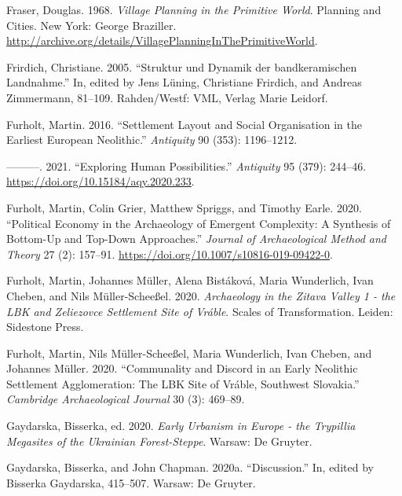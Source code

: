 \documentclass[
  12pt,
  a4paper, twoside]{book}
\newlength{\cslhangindent}
\newlength{\cslentryspacingunit} %
\newenvironment{CSLReferences}[2] %
 {%
  \setlength{\parindent}{0pt}
  \ifodd #1
  \let\oldpar\par
  \def\par{\hangindent=\cslhangindent\oldpar}
  \fi
  \setlength{\parskip}{#2\cslentryspacingunit}
 }%
 {}
\begin{document}
\begin{CSLReferences}{1}{0}
\leavevmode{}%
Fraser, Douglas. 1968. \emph{Village Planning in the Primitive World}. Planning and Cities. New York: George Braziller. \url{http://archive.org/details/VillagePlanningInThePrimitiveWorld}.

\leavevmode{}%
Frirdich, Christiane. 2005. {``Struktur und Dynamik der bandkeramischen Landnahme.''} In, edited by Jens Lüning, Christiane Frirdich, and Andreas Zimmermann, 81--109. Rahden/Westf: VML, Verlag Marie Leidorf.

\leavevmode{}%
Furholt, Martin. 2016. {``Settlement Layout and Social Organisation in the Earliest European Neolithic.''} \emph{Antiquity} 90 (353): 1196--1212.

\leavevmode{}%
---------. 2021. {``Exploring Human Possibilities.''} \emph{Antiquity} 95 (379): 244--46. \url{https://doi.org/10.15184/aqy.2020.233}.

\leavevmode{}%
Furholt, Martin, Colin Grier, Matthew Spriggs, and Timothy Earle. 2020. {``Political Economy in the Archaeology of Emergent Complexity: A Synthesis of Bottom-Up and Top-Down Approaches.''} \emph{Journal of Archaeological Method and Theory} 27 (2): 157--91. \url{https://doi.org/10.1007/s10816-019-09422-0}.

\leavevmode{}%
Furholt, Martin, Johannes Müller, Alena Bistáková, Maria Wunderlich, Ivan Cheben, and Nils Müller-Scheeßel. 2020. \emph{Archaeology in the Zitava Valley 1 - the LBK and Zeliezovce Settlement Site of Vráble}. Scales of Transformation. Leiden: Sidestone Press.

\leavevmode{}%
Furholt, Martin, Nils Müller-Scheeßel, Maria Wunderlich, Ivan Cheben, and Johannes Müller. 2020. {``Communality and Discord in an Early Neolithic Settlement Agglomeration: The LBK Site of Vráble, Southwest Slovakia.''} \emph{Cambridge Archaeological Journal} 30 (3): 469--89.

\leavevmode{}%
Gaydarska, Bisserka, ed. 2020. \emph{Early Urbanism in Europe - the Trypillia Megasites of the Ukrainian Forest-Steppe}. Warsaw: De Gruyter.

\leavevmode{}%
Gaydarska, Bisserka, and John Chapman. 2020a. {``Discussion.''} In, edited by Bisserka Gaydarska, 415--507. Warsaw: De Gruyter.


\end{CSLReferences}
\end{document}
